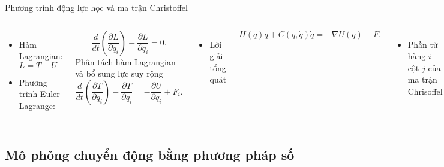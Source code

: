 \begin{frame}{Phương trình động lực học và ma trận Christoffel}
    \begin{columns}
        \begin{itemize}
            \item Hàm Lagrangian: \( L = T - U\)
            \item Phương trình Euler Lagrange:
        \end{itemize}
        \begin{equation}
            \dfrac{d}{dt} \left( \dfrac{\partial L}{\partial \dot{q}_i} \right) - \dfrac{\partial L}{\partial q_i} = 0.
        \end{equation}
        Phân tách hàm Lagrangian và bổ sung lực suy rộng
        \begin{equation}
            \dfrac{d}{dt} \left( \dfrac{\partial T}{\partial \dot{q}_i} \right) - \dfrac{\partial T}{\partial q_i} = - \dfrac{\partial U}{\partial q_i} + F_i.
        \end{equation}
        \begin{itemize}
            \item Lời giải tổng quát
        \end{itemize}
        \begin{equation}
            H(q) \ddot{q} + C(q, \dot{q}) \dot{q} = -\nabla U(q) + F.
        \end{equation}
        \begin{itemize}
            \item Phần tử hàng \(i\) cột \(j\) của ma trận Chrisoffel
        \end{itemize}
        \begin{equation}
            C_{ij} = \sum_{k=1}^{n} \frac{1}{2} \left( \frac{\partial H_{ik}}{\partial q_j} + \frac{\partial H_{jk}}{\partial q_i} - \frac{\partial H_{ij}}{\partial q_k} \right) \dot{q}_k.
        \end{equation}
    \end{columns}
\end{frame}

\subsection{Mô phỏng chuyển động bằng phương pháp số}

